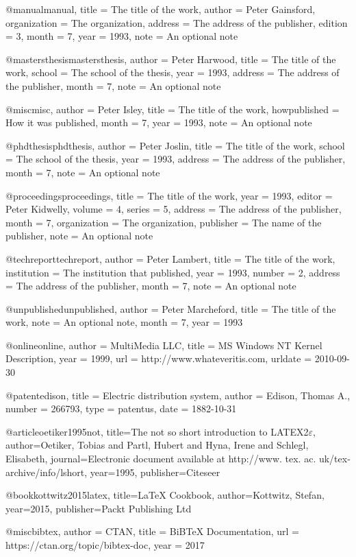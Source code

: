 @manual{manual,
  title        = {The title of the work},
  author       = {Peter Gainsford}, 
  organization = {The organization},
  address      = {The address of the publisher},
  edition      = 3,
  month        = 7,
  year         = 1993,
  note         = {An optional note}
}

@mastersthesis{mastersthesis,
  author       = {Peter Harwood}, 
  title        = {The title of the work},
  school       = {The school of the thesis},
  year         = 1993,
  address      = {The address of the publisher},
  month        = 7,
  note         = {An optional note}
}

@misc{misc,
  author       = {Peter Isley}, 
  title        = {The title of the work},
  howpublished = {How it was published},
  month        = 7,
  year         = 1993,
  note         = {An optional note}
}

@phdthesis{phdthesis,
  author       = {Peter Joslin}, 
  title        = {The title of the work},
  school       = {The school of the thesis},
  year         = 1993,
  address      = {The address of the publisher},
  month        = 7,
  note         = {An optional note}
}

@proceedings{proceedings,
  title        = {The title of the work},
  year         = 1993,
  editor       = {Peter Kidwelly},
  volume       = 4,
  series       = 5,
  address      = {The address of the publisher},
  month        = 7,
  organization = {The organization},
  publisher    = {The name of the publisher},
  note         = {An optional note}
}

@techreport{techreport,
  author       = {Peter Lambert}, 
  title        = {The title of the work},
  institution  = {The institution that published},
  year         = 1993,
  number       = 2,
  address      = {The address of the publisher},
  month        = 7,
  note         = {An optional note}
}

@unpublished{unpublished,
  author       = {Peter Marcheford}, 
  title        = {The title of the work},
  note         = {An optional note},
  month        = 7,
  year         = 1993
}

@online{online,
  author       = {MultiMedia LLC}, 
  title        = {{MS Windows NT} Kernel Description},
  year         = 1999,
  url          = {http://www.whateveritis.com},
  urldate      = {2010-09-30}
}

@patent{edison,
    title      = {Electric distribution system},
    author     = {Edison, Thomas A.},
    number     = {266793},
    type       = {patentus},
    date       = {1882-10-31}
}

@article{oetiker1995not,
  title={The not so short introduction to LATEX2$\varepsilon$},
  author={Oetiker, Tobias and Partl, Hubert and Hyna, Irene and Schlegl, Elisabeth},
  journal={Electronic document available at http://www. tex. ac. uk/tex-archive/info/lshort},
  year={1995},
  publisher={Citeseer}
}

@book{kottwitz2015latex,
  title={LaTeX Cookbook},
  author={Kottwitz, Stefan},
  year={2015},
  publisher={Packt Publishing Ltd}
}

@misc{bibtex,
  author       = {CTAN}, 
  title        = {{B}i{B}{T}e{X} Documentation},
  url          = {https://ctan.org/topic/bibtex-doc},
  year         = {2017}
}